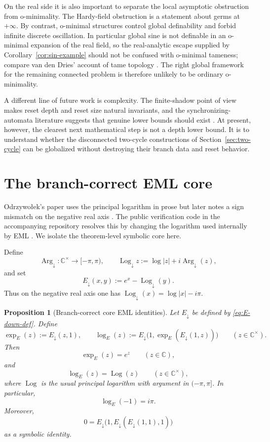 \documentclass[11pt]{amsart}
\numberwithin{equation}{section}
\newtheorem{proposition}[theorem]{Proposition}
\theoremstyle{remark}
\theoremstyle{definition}
\newcommand{\C}{\mathbb{C}}
\newcommand{\Argdown}{\operatorname{Arg}_{\downarrow}}
\newcommand{\Logdown}{\operatorname{Log}_{\downarrow}}
\newcommand{\Logp}{\operatorname{Log}}
\begin{document}
On the real side it is also important to separate the local asymptotic obstruction from o-minimality. The Hardy-field obstruction is a statement about germs at $+\infty$. By contrast, o-minimal structures control global definability and forbid infinite discrete oscillation. In particular global sine is not definable in an o-minimal expansion of the real field, so the real-analytic escape supplied by Corollary~\ref{cor:sin-example} should not be confused with o-minimal tameness; compare van den Dries' account of tame topology \cite{vandenDries1998}. The right global framework for the remaining connected problem is therefore unlikely to be ordinary o-minimality.

A different line of future work is complexity. The finite-shadow point of view makes reset depth and reset size natural invariants, and the synchronizing-automata literature suggests that genuine lower bounds should exist \cite{Volkov2008}. At present, however, the clearest next mathematical step is not a depth lower bound. It is to understand whether the disconnected two-cycle constructions of Section~\ref{sec:two-cycle} can be globalized without destroying their branch data and reset behavior.

\appendix

\section{The branch-correct EML core}\label{app:eml}

Odrzywo{\l}ek's paper uses the principal logarithm in prose but later notes a sign mismatch on the negative real axis \cite{Odrzywolek2026}. The public verification code in the accompanying repository resolves this by changing the logarithm used internally by EML \cite{OdrzywolekRepo,OdrzywolekVerifier}. We isolate the theorem-level symbolic core here.

Define
\[
\Argdown\colon \C^\times\to [-\pi,\pi),
\qquad
\Logdown z:=\log|z|+i\Argdown(z),
\]
and set
\begin{equation}\label{eq:E-down-def}
E_{\downarrow}(x,y):=e^x-\Logdown(y).
\end{equation}
Thus on the negative real axis one has $\Logdown(x)=\log|x|-i\pi$.

\begin{proposition}[Branch-correct core EML identities]\label{prop:branch-correct-eml}
Let $E_{\downarrow}$ be defined by \eqref{eq:E-down-def}. Define
\[
\exp_E(z):=E_{\downarrow}(z,1),
\qquad
\log_E(z):=E_{\downarrow}\bigl(1,\exp_E(E_{\downarrow}(1,z))\bigr)
\qquad (z\in \C^\times).
\]
Then
\[
\exp_E(z)=e^z\qquad (z\in \C),
\]
and
\[
\log_E(z)=\Logp(z)\qquad (z\in \C^\times),
\]
where $\Logp$ is the usual principal logarithm with argument in $(-\pi,\pi]$. In particular,
\[
\log_E(-1)=i\pi.
\]
Moreover,
\[
0=E_{\downarrow}\bigl(1,E_{\downarrow}(E_{\downarrow}(1,1),1)\bigr)
\]
as a symbolic identity.
\end{proposition}
\end{document}
